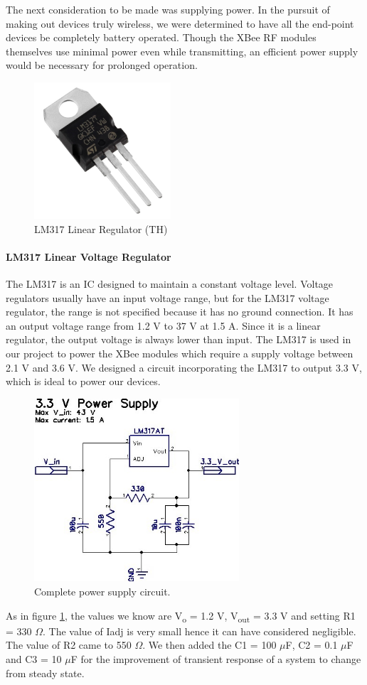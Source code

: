 \par The next consideration to be made was supplying power. In the pursuit of making out devices truly wireless, we were determined to have all the end-point devices be completely battery operated. Though the XBee RF modules themselves use minimal power even while transmitting, an efficient power supply would be necessary for prolonged operation. 
	\begin{figure}[h]
		\centering
		\includegraphics[width=2in]{lm317.jpg}
		\caption{\small LM317 Linear Regulator (TH)}
	\end{figure}
	\paragraph{\normalsize LM317 Linear Voltage Regulator \hspace{1.5em}} 
	The LM317 is an IC designed to maintain a constant voltage level. Voltage regulators usually have an input voltage range, but for the LM317 voltage regulator, the range is not specified because it has no ground connection. It has an output voltage range from 1.2 V to 37 V at 1.5 A. Since it is a linear regulator, the output voltage is always lower than input. The LM317 is used in our project to power the XBee modules which require a supply voltage between 2.1 V and 3.6 V. We designed a circuit incorporating the LM317 to output 3.3 V, which is ideal to power our devices. 
	\begin{figure}[h]
		\centering
		\includegraphics[width=3in]{33vsource.jpg}
		\caption{Complete power supply circuit.}
		\label{3v_circuit}
	\end{figure}
	\par As in figure \ref{3v_circuit}, the values we know are V\textsubscript{o} = 1.2 V, V\textsubscript{out} = 3.3 V and setting R1 = 330 $\Omega$.  The value of Iadj is very small hence it can have considered negligible. The value of R2 came to 550 $\Omega$. We then added the C1 = 100 $\mu$F, C2 = 0.1 $\mu$F and C3 = 10 $\mu$F for the improvement of transient response of a system to change from steady state. 
	
